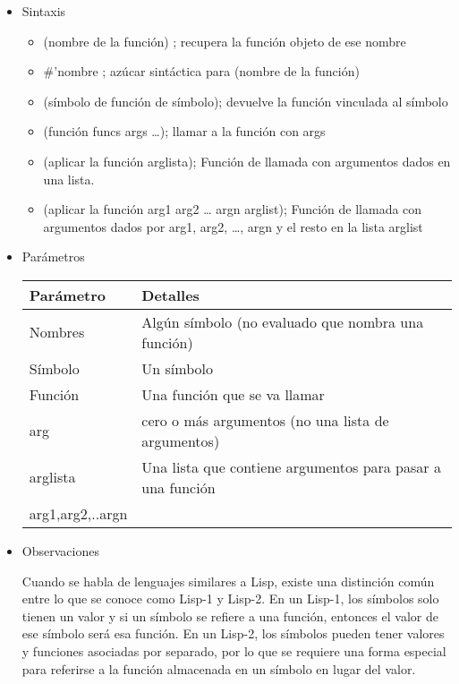 \documentclass[11pt]{article}
\begin{document}
\begin{itemize}
\item Sintaxis
\label{sec:org1fb9e4e}
\begin{itemize}
\item (nombre de la función) ; recupera la función objeto de ese nombre
\item \#'nombre ; azúcar sintáctica para (nombre de la función)
\item (símbolo de función de símbolo); devuelve la función vinculada al símbolo
\item (función funcs args \ldots{}); llamar a la función con args
\item (aplicar la función arglista); Función de llamada con argumentos dados en una lista.
\item (aplicar la función arg1 arg2 \ldots{} argn arglist); Función de llamada con argumentos dados por arg1, arg2, \ldots{}, argn y el resto en la lista arglist
\end{itemize}


\item Parámetros
\label{sec:org280af3d}

\begin{center}
\begin{tabular}{ll}
Parámetro & Detalles\\
\hline
Nombres & Algún símbolo (no evaluado que nombra una función)\\
\hline
Símbolo & Un símbolo\\
\hline
Función & Una función que se va llamar\\
\hline
arg & cero o más argumentos (no una lista de argumentos)\\
\hline
arglista & Una lista que contiene argumentos para pasar a una función\\
\hline
arg1,arg2,..argn & \\
\hline
\end{tabular}
\end{center}


\item Observaciones
\label{sec:orga5604ad}

Cuando se habla de lenguajes similares a Lisp, existe una distinción
común entre lo que se conoce como Lisp-1 y Lisp-2. En un Lisp-1, los
símbolos solo tienen un valor y si un símbolo se refiere a una
función, entonces el valor de ese símbolo será esa función. En un
Lisp-2, los símbolos pueden tener valores y funciones asociadas por
separado, por lo que se requiere una forma especial para referirse a
la función almacenada en un símbolo en lugar del valor.


\end{itemize}
\end{document}
